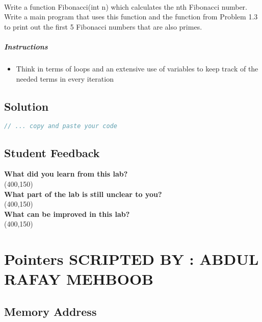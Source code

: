 \documentclass[11pt,fleqn]{book} %
\begin{document}
~\\
\begin{problem}
  Write a function Fibonacci(int n) which calculates the nth Fibonacci number. Write a main program that uses this function and the function from Problem 1.3 to print out the first 5 Fibonacci numbers that are also primes.
  \paragraph{Instructions}
  \begin{itemize}
  \item Think in terms of loops and an extensive use of variables to keep track of the needed terms in every iteration
  \end{itemize}
\end{problem}

\newpage
\section{Solution}
\begin{lstlisting}[language=C++]
  // ... copy and paste your code
\end{lstlisting}

\newpage
\section{Student Feedback}
\textbf{What did you learn from this lab?}\\ 
\framebox(400,150){}\\
\textbf{What part of the lab is still unclear to you?}\\
\framebox(400,150){}\\
\textbf{What can be improved in this lab?}\\ 
\framebox(400,150){}\\
\newpage
\chapter{Pointers \hspace{60mm} {\textsc{\small SCRIPTED BY : ABDUL RAFAY MEHBOOB}}}
\section{Memory Address}
\end{document}
